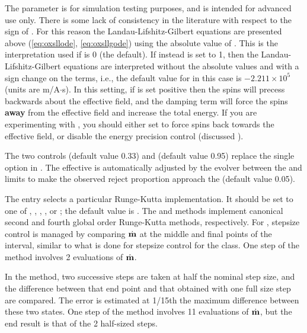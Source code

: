 \begin{description}
The  parameter is for simulation testing
purposes, and is intended for advanced use only.  There is some lack of
consistency in the literature with respect to the sign of
\abovemath{\gamma}.  For this reason the Landau-Lifshitz-Gilbert
equations are presented above (\ref{eq:oxsllode}, \ref{eq:oxsllgode})
using the absolute value of \abovemath{\gamma}.  This is the
interpretation used if  is 0 (the default).  If
instead  is set to 1, then the
Landau-Lifshitz-Gilbert equations are interpreted without the absolute
values and with a sign change on the \abovemath{\gamma} terms, i.e., the
default value for \abovemath{\gamma} in this case is $-2.211 \times
10^5$ (units are m/A$\cdot$s).  In this setting, if \abovemath{\gamma}
is set positive then the spins will precess backwards about the
effective field, and the damping term will force the spins \textbf{away}
from the effective field and increase the total energy.  If you are
experimenting with , you should either set
 to force spins back towards the effective field,
or disable the energy precision control (discussed
).

The two controls  (default value 0.33) and
 (default value 0.95) replace the single
 option in .  The effective
 is automatically adjusted by the evolver between the
 and  limits to make the
observed reject proportion approach the  (default
value 0.05).

The  entry selects a particular Runge-Kutta
implementation.  It should be set to one of ,
, , , or ;
the default value is .  The  and
 methods implement canonical second and fourth global order
Runge-Kutta methods\cite{stoer1993}, respectively.  For ,
stepsize control is managed by comparing $\dot{\textbf{m}}$ at the middle and
final points of the interval, similar to what is done for stepsize
control for the  class.  One step of the
 method involves 2 evaluations of $\dot{\textbf{m}}$.

In the  method, two successive steps are taken at half the
nominal step size, and the difference between that end point and that
obtained with one full size step are compared.  The error is estimated at
1/15th the maximum difference between these two states.  One step of the
 method involves 11 evaluations of $\dot{\textbf{m}}$, but the
end result is that of the 2 half-sized steps.


\end{description}
